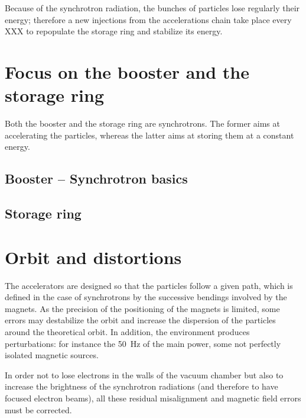 Because of the synchrotron radiation, the bunches of particles lose regularly their energy; therefore a new injections from the accelerations chain take place every XXX to repopulate the storage ring and stabilize its energy.

\section{Focus on the booster and the storage ring}
Both the booster and the storage ring are synchrotrons. The former aims at accelerating the particles, whereas the latter aims at storing them at a constant energy.

\subsection{Booster -- Synchrotron basics}

\subsection{Storage ring}

\section{Orbit and distortions}

The accelerators are designed so that the particles follow a given path, which is defined in the case of synchrotrons by the successive bendings involved by the magnets. As the precision of the positioning of the magnets is limited, some errors may destabilize the orbit and increase the dispersion of the particles around the theoretical orbit. In addition, the environment produces perturbations: for instance the 50~Hz of the main power, some not perfectly isolated magnetic sources.

In order not to lose electrons in the walls of the vacuum chamber but also to increase the brightness of the synchrotron radiations (and therefore to have focused electron beams), all these residual misalignment and magnetic field errors must be corrected.


